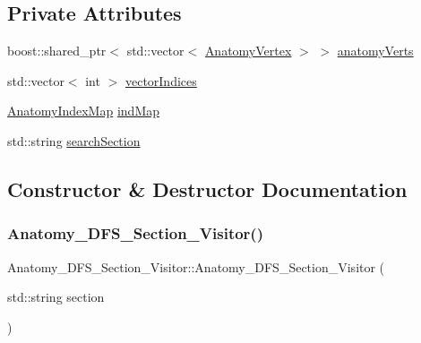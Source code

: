 \subsection*{Private Attributes}
\begin{DoxyCompactItemize}
\item 
boost\+::shared\+\_\+ptr$<$ std\+::vector$<$ \mbox{\hyperlink{_body_graph_8hpp_aeb92fc7b3eed88cf25a4fc7b708a66cf}{Anatomy\+Vertex}} $>$ $>$ \mbox{\hyperlink{class_anatomy___d_f_s___section___visitor_a8cfa2b3f70b1a3b54252d990d84e7842}{anatomy\+Verts}}
\item 
std\+::vector$<$ int $>$ \mbox{\hyperlink{class_anatomy___d_f_s___section___visitor_a12ea740c2f6405f5343ba2fdca3d180c}{vector\+Indices}}
\item 
\mbox{\hyperlink{_body_graph_8hpp_a9b727b123ee9682a6fc73a7785727450}{Anatomy\+Index\+Map}} \mbox{\hyperlink{class_anatomy___d_f_s___section___visitor_aa589aeb1afc570a76ff8bad92bcce25e}{ind\+Map}}
\item 
std\+::string \mbox{\hyperlink{class_anatomy___d_f_s___section___visitor_a99d83acb9c174dc61cfff9983f386f13}{search\+Section}}
\end{DoxyCompactItemize}


\subsection{Constructor \& Destructor Documentation}
\mbox{\label{class_anatomy___d_f_s___section___visitor_a43610fbf5ffe403904d18fe32e568817}} 
\subsubsection{\texorpdfstring{Anatomy\+\_\+\+D\+F\+S\+\_\+\+Section\+\_\+\+Visitor()}{Anatomy\_DFS\_Section\_Visitor()}}
{\footnotesize\ttfamily Anatomy\+\_\+\+D\+F\+S\+\_\+\+Section\+\_\+\+Visitor\+::\+Anatomy\+\_\+\+D\+F\+S\+\_\+\+Section\+\_\+\+Visitor (\begin{DoxyParamCaption}\item[{std\+::string}]{section }\end{DoxyParamCaption})\hspace{0.3cm}{\ttfamily [inline]}}




